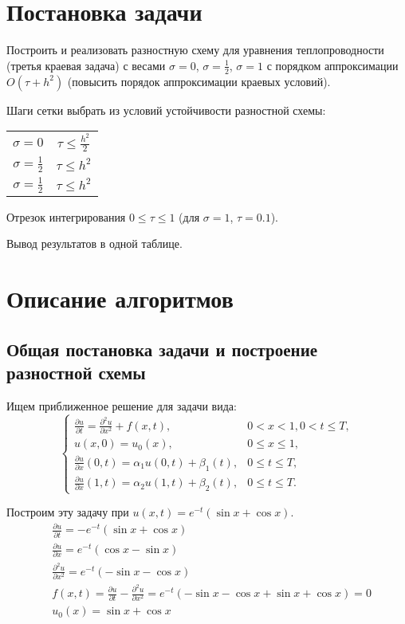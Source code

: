 





\chapter{Постановка задачи}
Построить и реализовать разностную схему для уравнения теплопроводности (третья краевая задача) с весами $\sigma=0$, $\sigma=\frac{1}{2}$, $\sigma=1$ с порядком аппроксимации $O(\tau+h^2)$ (повысить порядок аппроксимации краевых условий).\par
Шаги сетки выбрать из условий устойчивости разностной схемы:
\begin{tabular}{cc}
$\sigma=0$ & $\tau \le \frac{h^{2}}{2}$ \\
$\sigma=\frac{1}{2}$ & $\tau \le h^{2}$ \\
$\sigma=\frac{1}{2}$ & $\tau \le h^{2}$
\end{tabular} \par
Отрезок интегрирования $0 \le \tau \le 1$ (для $\sigma=1$, $\tau = 0.1$). \par
Вывод результатов в одной таблице.

\chapter{Описание алгоритмов}
\section{Общая постановка задачи и построение разностной схемы}
Ищем приближенное решение для задачи вида:
\begin{equation}
\left\{
\begin{array}{ll}
\frac{\partial u}{\partial t}=\frac{\partial^{2} u}{\partial x^{2}}+f(x,t), & 0<x<1, 0<t\le T, \\
u(x,0)=u_{0}(x), & 0\le x \le 1, \\
\frac{\partial u}{\partial x}(0,t)=\alpha_{1}u(0,t)+\beta_{1}(t), & 0 \le t \le T, \\
\frac{\partial u}{\partial x}(1,t)=\alpha_{2}u(1,t)+\beta_{2}(t), & 0 \le t \le T.
\end{array}
\right.
\end{equation}

Построим эту задачу при $u(x,t)=e^{-t}(\sin x + \cos x)$.
\begin{eqnarray*}
& \frac{\partial u}{\partial t}=-e^{-t}(\sin x + \cos x) \\
& \frac{\partial u}{\partial x}=e^{-t}(\cos x - \sin x) \\
& \frac{\partial^{2} u}{\partial x^{2}}=e^{-t}(-\sin x - \cos x) \\
& f(x,t)=\frac{\partial u}{\partial t}-\frac{\partial^{2} u}{\partial x^{2}}=e^{-t}(-\sin x - \cos x + \sin x + \cos x)=0 \\
& u_{0}(x)=\sin x + \cos x
\end{eqnarray*}

